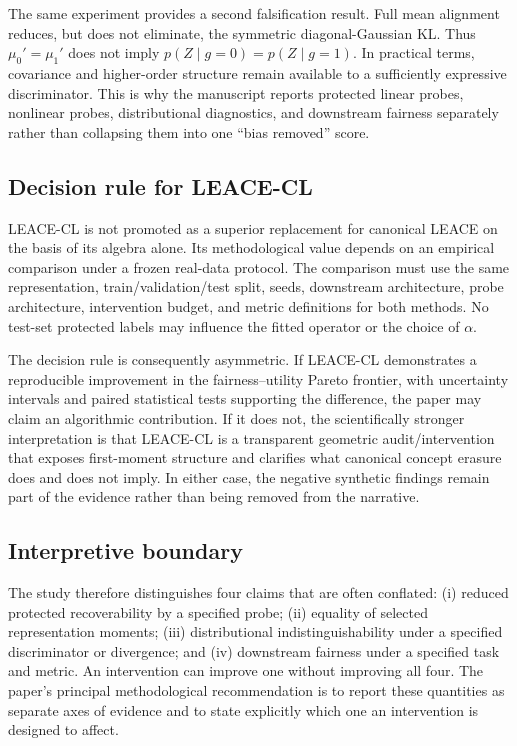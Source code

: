 The same experiment provides a second falsification result. Full mean alignment reduces, but does not eliminate, the symmetric diagonal-Gaussian KL. Thus $\mu_0'=\mu_1'$ does not imply $p(Z\mid g=0)=p(Z\mid g=1)$. In practical terms, covariance and higher-order structure remain available to a sufficiently expressive discriminator. This is why the manuscript reports protected linear probes, nonlinear probes, distributional diagnostics, and downstream fairness separately rather than collapsing them into one ``bias removed'' score.

\subsection{Decision rule for LEACE-CL}
\label{sec:leace-cl-decision}
LEACE-CL is not promoted as a superior replacement for canonical LEACE on the basis of its algebra alone. Its methodological value depends on an empirical comparison under a frozen real-data protocol. The comparison must use the same representation, train/validation/test split, seeds, downstream architecture, probe architecture, intervention budget, and metric definitions for both methods. No test-set protected labels may influence the fitted operator or the choice of $\alpha$.

The decision rule is consequently asymmetric. If LEACE-CL demonstrates a reproducible improvement in the fairness--utility Pareto frontier, with uncertainty intervals and paired statistical tests supporting the difference, the paper may claim an algorithmic contribution. If it does not, the scientifically stronger interpretation is that LEACE-CL is a transparent geometric audit/intervention that exposes first-moment structure and clarifies what canonical concept erasure does and does not imply. In either case, the negative synthetic findings remain part of the evidence rather than being removed from the narrative.

\subsection{Interpretive boundary}
\label{sec:interpretive-boundary}
The study therefore distinguishes four claims that are often conflated: (i) reduced protected recoverability by a specified probe; (ii) equality of selected representation moments; (iii) distributional indistinguishability under a specified discriminator or divergence; and (iv) downstream fairness under a specified task and metric. An intervention can improve one without improving all four. The paper's principal methodological recommendation is to report these quantities as separate axes of evidence and to state explicitly which one an intervention is designed to affect.
